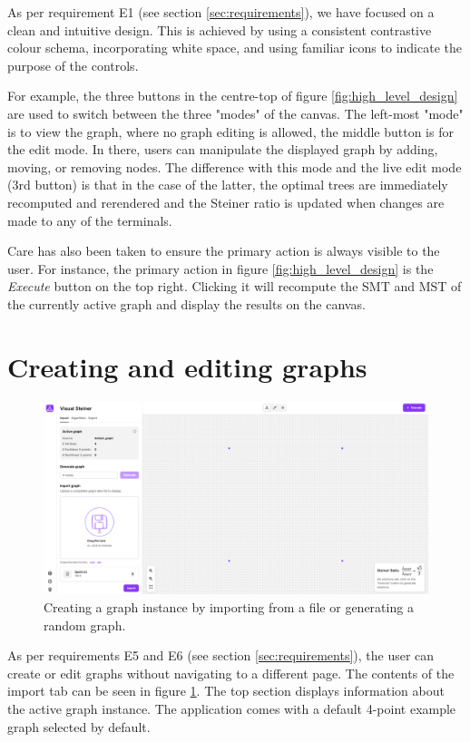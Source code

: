 \documentclass{l4proj}
\begin{document}
As per requirement E1 (see section \ref{sec:requirements}), we have focused on a clean and intuitive design. This is achieved by using a consistent contrastive colour schema, incorporating white space, and using familiar icons to indicate the purpose of the controls.

For example, the three buttons in the centre-top of figure \ref{fig:high_level_design} are used to switch between the three "modes" of the canvas. The left-most "mode" is to view the graph, where no graph editing is allowed, the middle button is for the edit mode. In there, users can manipulate the displayed graph by adding, moving, or removing nodes. The difference with this mode and the live edit mode (3rd button) is that in the case of the latter, the optimal trees are immediately recomputed and rerendered and the Steiner ratio is updated when changes are made to any of the terminals.

Care has also been taken to ensure the primary action is always visible to the user. For instance, the primary action in figure \ref{fig:high_level_design} is the \textit{Execute} button on the top right. Clicking it will recompute the SMT and MST of the currently active graph and display the results on the canvas.
\section{Creating and editing graphs}
\label{sec:creating_and_editing_graphs}

\begin{figure}[htbp]
    \centering
    \begin{tcolorbox}[colframe=gray!20, colback=gray!5, boxrule=1pt, arc=0mm, boxsep=0pt, left=0pt, right=0pt, top=0pt, bottom=0pt]
        \includegraphics[width=\textwidth]{images/import_view.png}
    \end{tcolorbox}

    \caption{Creating a graph instance by importing from a file or generating a random graph.}
    \label{fig:creating_and_editing_graphs}
\end{figure}
As per requirements E5 and E6 (see section \ref{sec:requirements}), the user can create or edit graphs without navigating to a different page.
The contents of the import tab can be seen in figure \ref{fig:creating_and_editing_graphs}. The top section displays information about the active graph instance. The application comes with a default 4-point example graph selected by default.
\end{document}
